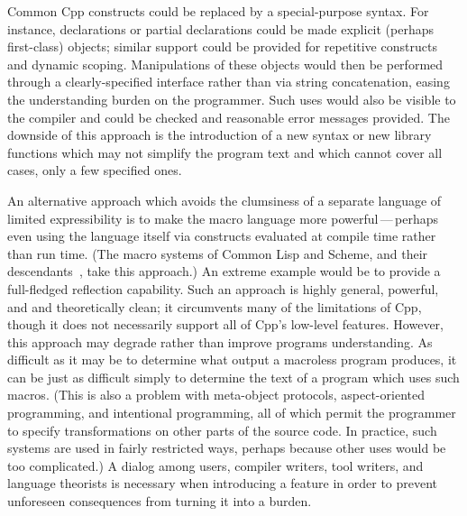 \documentclass[11pt]{article}
\begin{document}
Common Cpp constructs could be replaced by a special-purpose syntax.  For
instance, declarations or partial declarations could be made explicit
(perhaps first-class) objects; similar support could be provided for
repetitive constructs and dynamic scoping.  Manipulations of these objects would then
be performed through a clearly-specified interface rather than via string
concatenation, easing the understanding burden on the programmer.  Such
uses would also be visible to the compiler and could be checked and
reasonable error messages provided.  The downside of this approach is the
introduction of a new syntax or new library functions which may not
simplify the program text and which cannot cover all cases, only a few
specified ones.

An alternative approach which avoids the clumsiness of a separate language
of limited expressibility is to make the macro language more
powerful\,---\,perhaps even using the language itself via constructs
evaluated at compile time rather than run time.  (The macro systems of
Common Lisp and Scheme, and their descendants~\cite{WeiseC93}, take this
approach.)  An extreme example would be to provide a full-fledged
reflection capability.  Such an approach is highly general, powerful, and
and theoretically clean; it circumvents many of the limitations of Cpp,
though it does not necessarily support all of Cpp's low-level features.
However, this approach may degrade rather than improve programs
understanding.  As difficult as it may be to determine what output a
macroless program produces, it can be just as difficult simply to determine
the text of a program which uses such macros.  (This is also a problem with
meta-object protocols, aspect-oriented programming, and intentional
programming, all of which permit the programmer to specify transformations
on other parts of the source code.  In practice, such systems are used in
fairly restricted ways, perhaps because other uses would be too
complicated.)  A dialog among users, compiler writers, tool writers, and
language theorists is necessary when introducing a feature in order to
prevent unforeseen consequences from turning it into a burden.


% 
\end{document}
